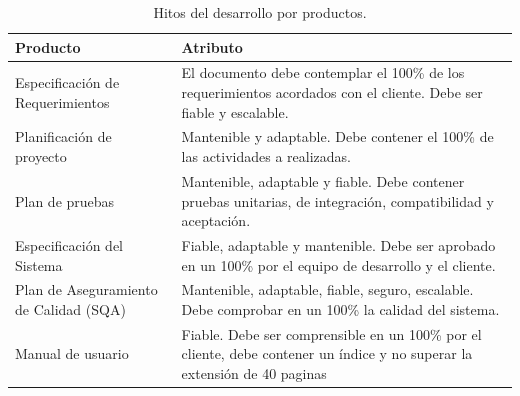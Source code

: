 \begin{table}[H]
    \caption[Hitos del desarrollo por productos.] {Hitos del desarrollo por productos.}
    \label{tbl:Objetivos Cuantificales y atributos de calidad por productos}
    \begin{tabular}{|p{}|p{}|}
        \hline
        \textbf{Producto} &  \textbf{Atributo}\\
    	\hline
    	\hline
    	Especificación de Requerimientos  & El documento debe contemplar el 100\% de los requerimientos acordados con el cliente. Debe ser fiable y escalable. \\ \hline
    	Planificación de proyecto & Mantenible y adaptable. Debe contener el 100\% de las actividades a realizadas. \\ \hline
    	Plan de pruebas & Mantenible, adaptable y fiable. Debe contener pruebas unitarias, de integración, compatibilidad y aceptación. \\ \hline
    	Especificación del Sistema & Fiable, adaptable y mantenible. Debe ser aprobado en un 100\% por el equipo de desarrollo y el cliente. \\ \hline
    	Plan de Aseguramiento de Calidad (SQA)  & Mantenible, adaptable, fiable, seguro, escalable. Debe comprobar en un 100\% la calidad del sistema.  \\ \hline
    	Manual de usuario & Fiable. Debe ser comprensible en un 100\% por el cliente, debe contener un índice y no superar la extensión de 40 paginas  \\ 
        \hline
    \end{tabular}
\end{table}

